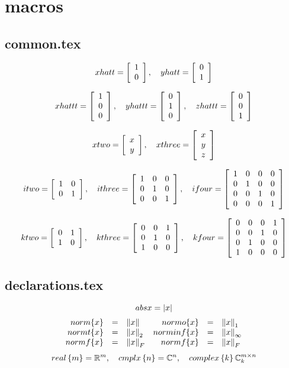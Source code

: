 \chapter*{macros}

\section{common.tex}
\begin{equation}
 xhatt = \xhatt,  \quad yhatt = \yhatt
\end{equation}

\begin{equation}
 xhattt = \xhattt, \quad yhattt = \yhattt, \quad zhattt = \zhattt
\end{equation}

\begin{equation}
 xtwo = \xtwo, \quad xthree = \xthree	
\end{equation}

\begin{equation}
 itwo = \itwo,  \quad ithree = \ithree, \quad ifour = \ifour
\end{equation}

\begin{equation}
 ktwo = \ktwo, \quad  kthree = \kthree, \quad kfour = \kfour
\end{equation}

\section{declarations.tex}
\begin{equation}
  abs x = \abs{x}
\end{equation}
\begin{equation}
  \begin{array}{rclrcl}
    norm \{x\}  &=& \norm{x}  & normo \{x\} &=& \normo{x}\\
    normt \{x\} &=& \normt{x} & norminf \{x\} &=& \norminf{x}\\
    normf \{x\} &=& \normf{x} & normf \{x\} &=& \normf{x}
  \end{array}
\end{equation}
\begin{equation}
    real\lst{m} = \real{m}, \quad cmplx\lst{n} = \cmplx{n}, \quad complex\lst{k}\complex{k}
\end{equation}

